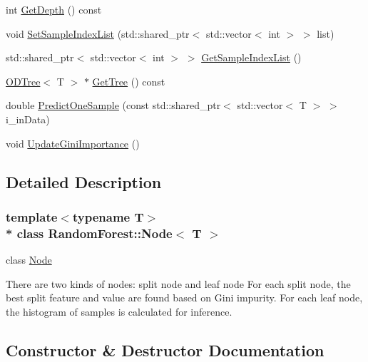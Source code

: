 \begin{DoxyCompactItemize}
\item 
int \hyperlink{class_random_forest_1_1_node_a0d04591229581053a11b7ea572b550be}{Get\+Depth} () const 
\item 
void \hyperlink{class_random_forest_1_1_node_ab76cbfde0c579c7c2a012ca023fb079a}{Set\+Sample\+Index\+List} (std\+::shared\+\_\+ptr$<$ std\+::vector$<$ int $>$ $>$ list)
\item 
std\+::shared\+\_\+ptr$<$ std\+::vector$<$ int $>$ $>$ \hyperlink{class_random_forest_1_1_node_a6848146a381aea5526d97df0774c556d}{Get\+Sample\+Index\+List} ()
\item 
\hyperlink{class_random_forest_1_1_o_d_tree}{O\+D\+Tree}$<$ T $>$ $\ast$ \hyperlink{class_random_forest_1_1_node_af6755fa1a90d9c2dd68a6e34b3775875}{Get\+Tree} () const 
\item 
double \hyperlink{class_random_forest_1_1_node_abc1b5d071f4ae9fdf4aa1e7e5c674a33}{Predict\+One\+Sample} (const std\+::shared\+\_\+ptr$<$ std\+::vector$<$ T $>$ $>$ i\+\_\+in\+Data)
\item 
void \hyperlink{class_random_forest_1_1_node_a781cdf34b7fc5bbb12575c2397b51d56}{Update\+Gini\+Importance} ()
\end{DoxyCompactItemize}


\subsection{Detailed Description}
\subsubsection*{template$<$typename T$>$\\*
class Random\+Forest\+::\+Node$<$ T $>$}

class \hyperlink{class_random_forest_1_1_node}{Node} 

There are two kinds of nodes\+: split node and leaf node For each split node, the best split feature and value are found based on Gini impurity. For each leaf node, the histogram of samples is calculated for inference. 

\subsection{Constructor \& Destructor Documentation}
